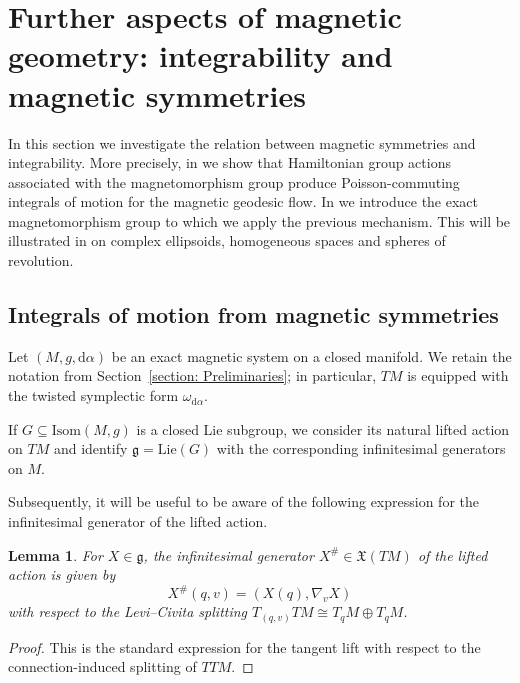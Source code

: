 \documentclass[11pt,reqno]{amsart}
\newcommand{\Lie}{\mathrm{Lie}}
\newcommand{\Isom}{\mathrm{Isom}}
\theoremstyle{plain}
\newtheorem{lem}[thm]{Lemma}
\theoremstyle{definition}
\numberwithin{equation}{section}
\def\d{\delta}
\def\d{\delta}
\def\d{{\mathrm{d}}}
\begin{document}
\section{Further aspects of magnetic geometry: integrability and magnetic symmetries}
\label{section: Magnetic Geometry of Hypersurfaces}

In this section we investigate the relation between magnetic symmetries and integrability. More precisely, in  we show that Hamiltonian group actions associated with the magnetomorphism group produce Poisson-commuting integrals of motion for the magnetic geodesic flow. In  we introduce the exact magnetomorphism group to which we apply the previous mechanism. This will be illustrated in  on complex ellipsoids, homogeneous spaces and spheres of revolution.

\subsection{Integrals of motion from magnetic symmetries}
\label{subsection: magnetic geometry- integrals of motion}

Let $(M,g,\d\alpha)$ be an exact magnetic system on a closed manifold. We retain the notation from Section~\ref{section: Preliminaries}; in particular, $TM$ is equipped with the twisted symplectic form $\omega_{\d\alpha}$.

If $G\subseteq \Isom(M,g)$ is a closed Lie subgroup, we consider its natural lifted action on $TM$ and identify $\mathfrak g=\Lie(G)$ with the corresponding infinitesimal generators on $M$.

Subsequently, it will be useful to be aware of the following expression for the infinitesimal generator of the lifted action.

\begin{lem}
\label{lem: infinitesimal generator}
For $X\in\mathfrak g$, the infinitesimal generator $X^\#\in\mathfrak X(TM)$ of the lifted action is given by
\[
X^\#(q,v)=(X(q),\nabla_vX)
\]
with respect to the Levi--Civita splitting $T_{(q,v)}TM\cong T_qM\oplus T_qM$.
\end{lem}

\begin{proof}
This is the standard expression for the tangent lift with respect to the connection-induced splitting of $TTM$.
\end{proof}
\end{document}
